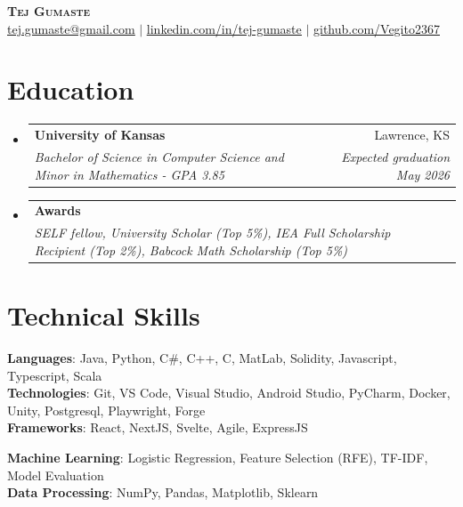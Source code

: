 \documentclass[letterpaper,10.5pt]{article}
\makeatletter
\newcommand{\resumeSubheading}[4]{
  \vspace{-2pt}\item
    \begin{tabular*}{0.97\textwidth}[t]{l@{\extracolsep{\fill}}r}
      \textbf{#1} & #2 \\
      \textit{\small#3} & \textit{\small #4} \\
    \end{tabular*}\vspace{-7pt}
}
\newcommand{\resumeSubHeadingListStart}{\begin{itemize}[leftmargin=0.15in, label={}]}
\newcommand{\resumeSubHeadingListEnd}{\end{itemize}}
\makeatother
\begin{document}
\begin{center}
    \textbf{\Huge \scshape Tej Gumaste} \\ \vspace{1pt}
    \small \href{mailto:tej.gumaste@gmail.com}{\underline{tej.gumaste@gmail.com}} $|$ 
    \href{https://www.linkedin.com/in/tej-gumaste/}{\underline{linkedin.com/in/tej-gumaste}} $|$
    \href{https://www.github.com/Vegito2367}{\underline{github.com/Vegito2367}}
\end{center}


\section{Education}
  \resumeSubHeadingListStart
    \resumeSubheading
      {University of Kansas}{Lawrence, KS}
      {Bachelor of Science in Computer Science and Minor in Mathematics - GPA 3.85} {Expected graduation May 2026}
      \resumeSubheading
      {Awards}{}
      {SELF fellow, University Scholar (Top 5\%), IEA Full Scholarship Recipient (Top 2\%), Babcock Math Scholarship (Top 5\%)}{}

  \resumeSubHeadingListEnd

\section{Technical Skills}
 \begin{itemize}[leftmargin=0.15in, label={}]
    \small{\item{
     \textbf{Languages}{: Java, Python, C\#, C++, C, MatLab, Solidity, Javascript, Typescript, Scala} \\
     \textbf{Technologies}{: Git, VS Code, Visual Studio, Android Studio, PyCharm, Docker, Unity, Postgresql, Playwright, Forge} \\
     \textbf{Frameworks}{: React, NextJS, Svelte, Agile, ExpressJS}\\
    }}
    \textbf{Machine Learning}{: Logistic Regression, Feature Selection (RFE), TF-IDF, Model Evaluation}\\
     \textbf{Data Processing}{: NumPy, Pandas, Matplotlib, Sklearn}
    
    
 \end{itemize}
  
\end{document}
